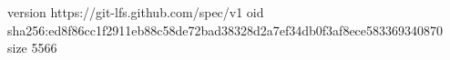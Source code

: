version https://git-lfs.github.com/spec/v1
oid sha256:ed8f86cc1f2911eb88c58de72bad38328d2a7ef34db0f3af8ece583369340870
size 5566
